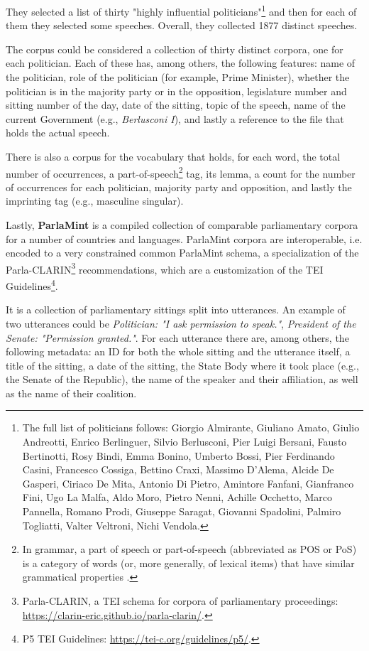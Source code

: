 They selected a list of thirty "highly influential politicians"\footnote{The full list of politicians follows: Giorgio Almirante, Giuliano Amato, Giulio Andreotti, Enrico Berlinguer, Silvio Berlusconi, Pier Luigi Bersani, Fausto Bertinotti, Rosy Bindi, Emma Bonino, Umberto Bossi, Pier Ferdinando Casini, Francesco Cossiga, Bettino Craxi, Massimo D'Alema, Alcide De Gasperi, Ciriaco De Mita, Antonio Di Pietro, Amintore Fanfani, Gianfranco Fini, Ugo La Malfa, Aldo Moro, Pietro Nenni, Achille Occhetto, Marco Pannella, Romano Prodi, Giuseppe Saragat, Giovanni Spadolini, Palmiro Togliatti, Valter Veltroni, Nichi Vendola.} and then for each of them they selected some speeches. Overall, they collected 1877 distinct speeches.

The corpus could be considered a collection of thirty distinct corpora, one for each politician. Each of these has, among others, the following features: name of the politician, role of the politician (for example, Prime Minister), whether the politician is in the majority party or in the opposition, legislature number and sitting number of the day, date of the sitting, topic of the speech, name of the current Government (e.g., \textit{Berlusconi I}), and lastly a reference to the file that holds the actual speech.

There is also a corpus for the vocabulary that holds, for each word, the total number of occurrences, a part-of-speech\footnote{In grammar, a part of speech or part-of-speech (abbreviated as POS or PoS) is a category of words (or, more generally, of lexical items) that have similar grammatical properties \cite{payne_describing_1997}.} tag, its lemma, a count for the number of occurrences for each politician, majority party and opposition, and lastly the imprinting tag (e.g., masculine singular).

Lastly, \textbf{ParlaMint} \cite{erjavec_parlamint_2023,erjavec_parlamint_2025} is a compiled collection of comparable parliamentary corpora for a number of countries and languages. ParlaMint corpora are interoperable, i.e. encoded to a very constrained common ParlaMint schema, a specialization of the Parla-CLARIN\footnote{Parla-CLARIN, a TEI schema for corpora of parliamentary proceedings: \url{https://clarin-eric.github.io/parla-clarin/}.} recommendations, which are a customization of the TEI Guidelines\footnote{P5 TEI Guidelines: \url{https://tei-c.org/guidelines/p5/}.}.

It is a collection of parliamentary sittings split into utterances. An example of two utterances could be \textit{Politician: "I ask permission to speak."}, \textit{President of the Senate: "Permission granted."}. For each utterance there are, among others, the following metadata: an ID for both the whole sitting and the utterance itself, a title of the sitting, a date of the sitting, the State Body where it took place (e.g., the Senate of the Republic), the name of the speaker and their affiliation, as well as the name of their coalition. 

